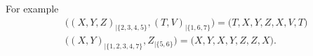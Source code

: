 \documentclass{amsart}
\newtheorem{notation}[claim]{Notation}
\begin{document}
 For example
 \begin{align*}
& \big( (X, Y, Z)_{| \{2, 3, 4, 5\}}, (T, V)_{|\{1, 6, 7 \} } \big) 
= \big( T, X, Y, Z, X, V, T \big) \\
& \big( (X, Y)_{| \{ 1, 2, 3, 4, 7\}}, Z_{|\{5, 6\}} \big) = 
 \big( X, Y, X, Y, Z, Z, X\big).
 \end{align*}
 
% 
% 
% 
 
\end{document}
